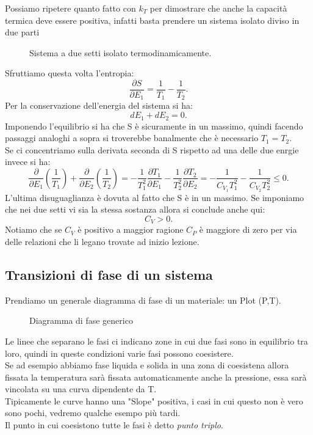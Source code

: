 \noindent 
Possiamo ripetere quanto fatto con $k_{T}$ per dimostrare che anche la capacità termica deve essere positiva, infatti basta prendere un sistema isolato diviso in due parti
\begin{figure}[H]
    \centering
    \caption{Sistema a due setti isolato termodinamicamente.}
    \label{fig:sistema-isolato}
\end{figure}
\noindent
Sfruttiamo questa volta l'entropia:
\[
	\frac{\partial S}{\partial E_1} = \frac{1}{T_1}- \frac{1}{T_2}
.\] 
Per la conservazione dell'energia del sistema si ha:
\[
	dE_1 + dE_2=0
.\] 
Imponendo l'equilibrio si ha che S è sicuramente in un massimo, quindi facendo passaggi analoghi a sopra si troverebbe banalmente che è necessario $T_1 = T_2$.\\
Se ci concentriamo sulla derivata seconda di S rispetto ad una delle due enrgie invece si ha:
\[
	\frac{\partial }{\partial E_1} \left( \frac{1}{T_1} \right) + \frac{\partial }{\partial E_2} \left( \frac{1}{T_2} \right) =
	-\frac{1}{T_1^2}\frac{\partial T_1}{\partial E_1} -\frac{1}{T_2^2}\frac{\partial T_2}{\partial E_2} = 
	-\frac{1}{C_{V_1}T_1^2}-\frac{1}{C_{V_2}T_2^2} \le 0
.\] 
L'ultima disuguaglianza è dovuta al fatto che S è in un massimo. Se imponiamo che nei due setti vi sia la stessa sostanza allora si conclude anche qui:
\[
	C_{V}>0
.\] 
Notiamo che se $C_{V}$ è positivo a maggior ragione $C_{P}$ è maggiore di zero per via delle relazioni che li legano trovate ad inizio lezione.

\subsection{Transizioni di fase di un sistema}%
Prendiamo un generale diagramma di fase di un materiale: un Plot (P,T).
\begin{figure}[H]
    \centering
    \caption{Diagramma di fase generico}
    \label{fig:diagramma-di-fase-generico}
\end{figure}
\noindent
Le linee che separano le fasi ci indicano zone in cui due fasi sono in equilibrio tra loro, quindi in queste condizioni varie fasi possono coesistere. \\
Se ad esempio abbiamo fase liquida e solida in una zona di coesistena allora fissata la temperatura sarà fissata automaticamente anche la pressione, essa sarà vincolata su una curva dipendente da T.\\
Tipicamente le curve hanno una "Slope" positiva, i casi in cui questo non è vero sono pochi, vedremo qualche esempo più tardi.\\
Il punto in cui coesistono tutte le fasi è detto \textit{punto triplo}.

